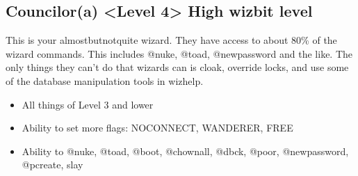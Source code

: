 \documentclass[letterpaper,10pt,english]{sphinxmanual}
\begin{document}
\subsection{Councilor(a) \textless{}Level 4\textgreater{} \sphinxhyphen{} High wizbit level}
\label{\detokenize{toggles:councilor-a-level-4-high-wizbit-level}}
\sphinxAtStartPar
This is your almost\sphinxhyphen{}but\sphinxhyphen{}not\sphinxhyphen{}quite wizard.  They have access to
about 80\% of the wizard commands.  This includes @nuke, @toad,
@newpassword and the like.  The only things they can’t do that
wizards can is cloak, override locks, and use some of the
database manipulation tools in wizhelp.
\begin{itemize}
\item {} 
\sphinxAtStartPar
All things of Level 3 and lower

\item {} 
\sphinxAtStartPar
Ability to set more flags: NOCONNECT, WANDERER, FREE

\item {} 
\sphinxAtStartPar
Ability to @nuke, @toad, @boot, @chownall, @dbck, @poor, @newpassword, @pcreate, slay

\end{itemize}
\end{document}
